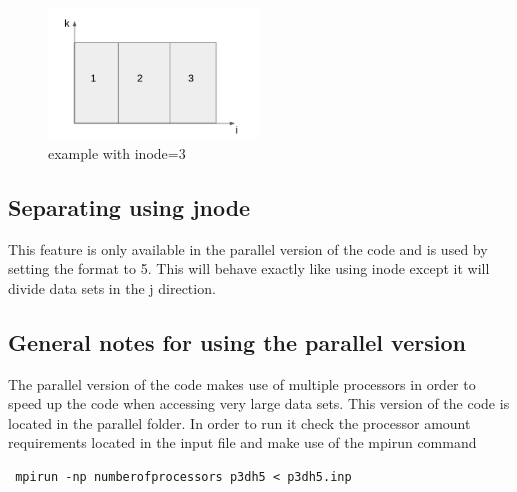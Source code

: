 \documentclass[12pt, oneside]{article}
\begin{document}
\begin{figure}[H]
\centering
\includegraphics[width=0.5\textwidth]{FIGS/Inode.png}

\caption{{\footnotesize example with inode=3}}
\label{fig: } 
\end{figure}

\subsection{Separating using jnode}
This feature is only available in the parallel version of the code and is used by setting the format to 5. This will behave exactly like using inode except it will divide
data sets in the j direction.

\subsection{General notes for using the parallel version}
The parallel version of the code makes use of multiple processors in order to speed up the code when accessing very large data sets. This version of the code is located
in the parallel folder. In order to run it check the processor amount requirements located in the input file and make use of the mpirun command

\begin{verbatim}
 mpirun -np numberofprocessors p3dh5 < p3dh5.inp 
\end{verbatim}
\end{document}
